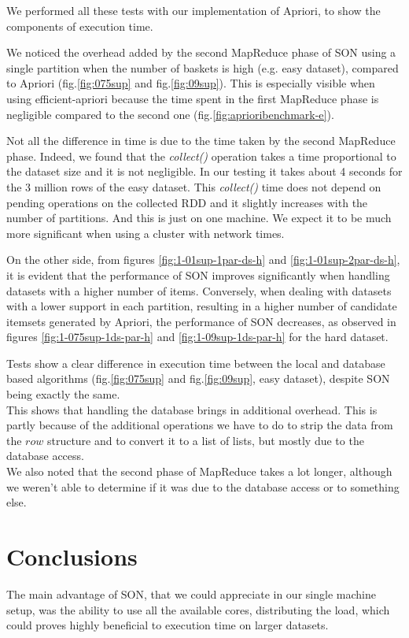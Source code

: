 \documentclass[a4paper]{article}
\begin{document}
	We performed all these tests with our implementation of Apriori, to show the components of execution time.
	
	We noticed the overhead added by the second MapReduce phase of SON using a single partition when the number of baskets is high (e.g. easy dataset), compared to Apriori (fig.\ref{fig:075sup} and fig.\ref{fig:09sup}). This is especially visible when using efficient-apriori because the time spent in the first MapReduce phase is negligible compared to the second one (fig.\ref{fig:aprioribenchmark-e}).

	Not all the difference in time is due to the time taken by the second MapReduce phase. Indeed, we found that the \textit{collect()} operation takes a time proportional to the dataset size and it is not
	negligible. In our testing it takes about 4 seconds for the 3 million rows of the easy dataset. This \textit{collect()} time does not depend on pending operations on the collected RDD and it slightly increases with the number of partitions. And this is just on one machine. We expect it to be much
	more significant when using a cluster with network times.

	On the other side, from figures \ref{fig:1-01sup-1par-ds-h} and \ref{fig:1-01sup-2par-ds-h}, it is evident that the performance of SON improves significantly when handling datasets with a higher number of items. Conversely, when dealing with datasets with a lower support in each partition, resulting in a higher number of candidate itemsets generated by Apriori, the performance of SON decreases, as observed in figures \ref{fig:1-075sup-1ds-par-h} and \ref{fig:1-09sup-1ds-par-h} for the hard dataset.

	Tests show a clear difference in execution time between the local and database based algorithms (fig.\ref{fig:075sup} and fig.\ref{fig:09sup}, easy dataset), despite SON being exactly the same.\\
	This shows that handling the database brings in additional overhead.
	This is partly because of the additional operations we have to do to strip the data from the $row$ structure and to convert it to a list of lists, but mostly due to the database access.\\	
	We also noted that the second phase of MapReduce takes a lot longer, although we weren't able to determine if it was due to the database access or to something else.\\
	
	\section{Conclusions}
	\label{section:conclusion}
	The main advantage of SON, that we could appreciate in our single machine setup, was the ability to use all the available cores, distributing the load, which could proves highly beneficial to execution time on larger datasets.\\
\end{document}
